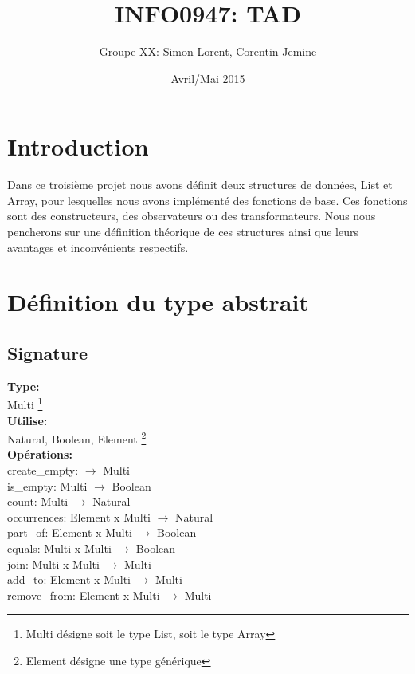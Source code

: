 \documentclass[a4paper, 11pt, oneside]{article}
\begin{document}

\title{INFO0947: TAD}
\author{Groupe XX: Simon Lorent, Corentin Jemine}
\date{Avril/Mai 2015}

\maketitle
\clearpage

\section{Introduction}
	Dans ce troisième projet nous avons définit deux structures de données, List et Array, pour lesquelles nous avons implémenté des fonctions de base. Ces fonctions sont des constructeurs, des observateurs ou des transformateurs. Nous nous pencherons sur une définition théorique de ces structures ainsi que leurs avantages et inconvénients respectifs.

\section{Définition du type abstrait}
	\subsection{Signature}
	\noindent \textbf{Type:}
	\\ \indent Multi \footnote{Multi désigne soit le type List, soit le type Array}
	\\ \textbf{Utilise:}
	\\ \indent Natural, Boolean, Element \footnote{Element désigne une type générique}
	\\ \textbf{Opérations:}
	\\ \indent create\_empty: $\rightarrow$ Multi
	\\ \indent is\_empty: Multi $\rightarrow$ Boolean
	\\ \indent count: Multi $\rightarrow$ Natural
	\\ \indent occurrences: Element x Multi $\rightarrow$ Natural
	\\ \indent part\_of: Element x Multi $\rightarrow$ Boolean
	\\ \indent equals: Multi x Multi $\rightarrow$ Boolean
	\\ \indent join: Multi x Multi $\rightarrow$ Multi
	\\ \indent add\_to: Element x Multi $\rightarrow$ Multi
	\\ \indent remove\_from: Element x Multi $\rightarrow$ Multi
\end{document}
